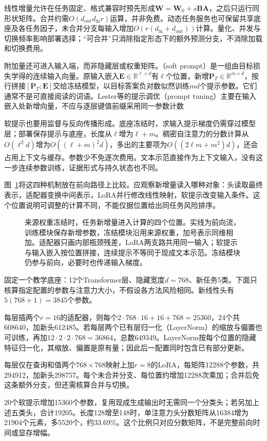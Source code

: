 线性增量允许在任务固定、格式兼容时预先形成$\bm W=\bm W_0+s\bm B\bm A$，之后只运行同形状矩阵。合并约需$O(d_{\mathrm{out}}d_{\mathrm{in}}r)$运算，并非免费。动态任务服务也可保留共享底座及各任务因子，未合并分支每输入增加$O(r(d_{\mathrm{in}}+d_{\mathrm{out}}))$计算。量化、并发与切换频率影响部署选择；“可合并”只消除指定形态下的额外预测分支，不消除加载和切换费用。

附加量还可进入输入端，而非隐藏层或权重矩阵。（soft prompt）是一组由目标损失学得的连续输入向量。原输入嵌入$\bm E\in\mathbb R^{\ell\times d}$有$\ell$个位置，新增$\bm P_T\in\mathbb R^{m\times d}$，按行拼接$[\bm P_T;\bm E]$交给冻结模型，以目标答案负对数似然训练$md$个提示参数。它们通常不是可直接阅读的词语。Lester等的提示调优（prompt tuning）主要在输入嵌入处新增向量，不应与逐层键值前缀采用同一参数计数

软提示也要用监督与反向传播形成。底座冻结时，求输入提示梯度仍需穿过模型层；部署保存提示与底座，长度从$\ell$增为$\ell+m$。稠密自注意力的分数计算从$O(\ell^2d)$增为$O((\ell+m)^2d)$，多出的主要项为$O((2\ell m+m^2)d)$，还会占用上下文与缓存。参数少不免逐次费用。文本示范直接作为上下文输入，没有这一步连续参数训练，证据形式与持久状态也不同。

图~\ref{fig:ket-transfer-added-locations}将这四种机制放在前向路径上比较。应观察新增量读入哪种对象：头读取最终表示，适配器变换中间表示，LoRA并行修改线性映射，软提示改变输入条件。这个位置说明可调整的计算不同，不能仅据位置给出同任务风险排序。

\begin{figure}[htbp]
  \centering
  
  \caption{来源权重冻结时，任务新增量进入计算的四个位置。实线为前向流，训练模块保存新增参数，冻结模块沿用来源权重，加号表示同维相加。适配器只画内部瓶颈残差，LoRA两支路共用同一输入；软提示与输入嵌入按位置拼接，连续提示不等同于现成文本示范。冻结模块仍参与前向，必要时也传递输入梯度。}
  \label{fig:ket-transfer-added-locations}
\end{figure}
\FloatBarrier

\begin{example}[固定底座下的参数与计算核算]
  \label{ex:ket-transfer-parameter-counts}
  固定一个教学底座：12个Transformer层、隐藏宽度$d=768$、新任务5类。下面只核算指定配置的参数与注意力大小，不假设各方法风险相同。新线性头有$5(768+1)=3845$个参数。

  每层插两个$r=16$的适配器，则每个$2\cdot768\cdot16+16+768=25360$，24个共608640，加新头612485。若每层两个已有层归一化（LayerNorm）的缩放与偏置也可训练，再加$12\cdot2\cdot2\cdot768=36864$，总数649349。LayerNorm按每个位置的隐藏特征归一化，其缩放、偏置是原有量；因此后一配置同时包含已有部分更新。

  每层仅在查询和值两个$768\times768$映射上加$r=8$的LoRA，每矩阵12288个参数，共294912，加新头298757。每个未合并分支、每位置约增加12288次乘加；合并后免这条额外分支，但还需核算合并与切换。

  20个软提示增加15360个参数，复用现成生成输出时无需同一个分类头；若另加上述五类头，合计19205。长度128增至148时，单注意力头分数矩阵从16384增为21904个元素，多5520个，约33.69\%。这个比例只对应分数矩阵，不是完整前向时间或显存增幅。
\end{example}

